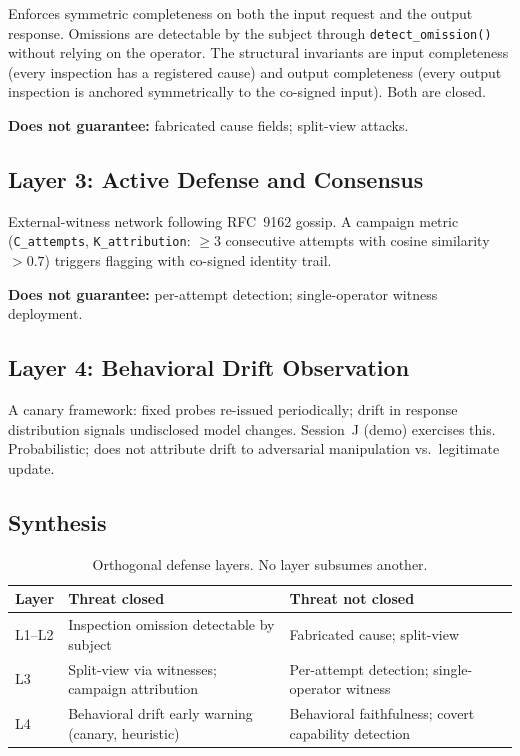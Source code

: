 \documentclass[11pt,a4paper]{article}
\newcommand{\code}[1]{\texttt{#1}}
\begin{document}
Enforces symmetric completeness on both the input request and the output response.
Omissions are detectable by the subject through \code{detect\_omission()} without
relying on the operator. The structural invariants are input completeness (every
inspection has a registered cause) and output completeness (every output inspection is
anchored symmetrically to the co-signed input). Both are closed.

\textbf{Does not guarantee:} fabricated cause fields; split-view attacks.

\subsection{Layer 3: Active Defense and Consensus}

External-witness network following RFC~9162 gossip. A campaign metric
(\code{C\_attempts}, \code{K\_attribution}: $\geq 3$ consecutive attempts with cosine
similarity $>0.7$) triggers flagging with co-signed identity trail.

\textbf{Does not guarantee:} per-attempt detection; single-operator witness deployment.

\subsection{Layer 4: Behavioral Drift Observation}

A canary framework: fixed probes re-issued periodically; drift in response distribution
signals undisclosed model changes. Session~J (demo) exercises this. Probabilistic; does
not attribute drift to adversarial manipulation vs.\ legitimate update.

\subsection{Synthesis}

\begin{table}[h]
\centering
\small
\renewcommand{\arraystretch}{1.2}
\begin{tabular}{@{}lp{5cm}p{5cm}@{}}
\toprule
\textbf{Layer} & \textbf{Threat closed} & \textbf{Threat not closed} \\
\midrule
L1--L2 & Inspection omission detectable by subject & Fabricated cause; split-view \\
L3 & Split-view via witnesses; campaign attribution & Per-attempt detection; single-operator witness \\
L4 & Behavioral drift early warning (canary, heuristic) & Behavioral faithfulness; covert capability detection \\
\bottomrule
\end{tabular}
\caption{Orthogonal defense layers. No layer subsumes another.}
\end{table}
\end{document}
